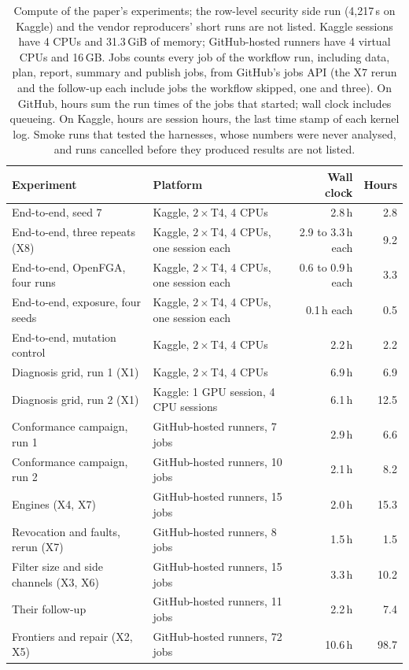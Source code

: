 \begin{table}[!htbp]
\centering
\footnotesize\setlength{\tabcolsep}{4pt}
\begin{tabular}{@{}llrr@{}}
\toprule
Experiment & Platform & Wall clock & Hours \\
\midrule
End-to-end, seed 7 & Kaggle, $2\times$T4, 4 CPUs & 2.8\,h & 2.8 \\
End-to-end, three repeats (X8) & Kaggle, $2\times$T4, 4 CPUs, one session each & 2.9 to 3.3\,h each & 9.2 \\
End-to-end, OpenFGA, four runs & Kaggle, $2\times$T4, 4 CPUs, one session each & 0.6 to 0.9\,h each & 3.3 \\
End-to-end, exposure, four seeds & Kaggle, $2\times$T4, 4 CPUs, one session each & 0.1\,h each & 0.5 \\
End-to-end, mutation control & Kaggle, $2\times$T4, 4 CPUs & 2.2\,h & 2.2 \\
Diagnosis grid, run 1 (X1) & Kaggle, $2\times$T4, 4 CPUs & 6.9\,h & 6.9 \\
Diagnosis grid, run 2 (X1) & Kaggle: 1 GPU session, 4 CPU sessions & 6.1\,h & 12.5 \\
Conformance campaign, run 1 & GitHub-hosted runners, 7 jobs & 2.9\,h & 6.6 \\
Conformance campaign, run 2 & GitHub-hosted runners, 10 jobs & 2.1\,h & 8.2 \\
Engines (X4, X7) & GitHub-hosted runners, 15 jobs & 2.0\,h & 15.3 \\
Revocation and faults, rerun (X7) & GitHub-hosted runners, 8 jobs & 1.5\,h & 1.5 \\
Filter size and side channels (X3, X6) & GitHub-hosted runners, 15 jobs & 3.3\,h & 10.2 \\
Their follow-up & GitHub-hosted runners, 11 jobs & 2.2\,h & 7.4 \\
Frontiers and repair (X2, X5) & GitHub-hosted runners, 72 jobs & 10.6\,h & 98.7 \\
\bottomrule
\end{tabular}
\caption{Compute of the paper's experiments; the row-level security side run (4,217\,s on Kaggle) and the vendor reproducers' short runs are not listed. Kaggle sessions have 4 CPUs and 31.3\,GiB of
memory; GitHub-hosted runners have 4 virtual CPUs and 16\,GB. Jobs counts every job of the workflow
run, including data, plan, report, summary and publish jobs, from GitHub's jobs API (the X7 rerun and
the follow-up each include jobs the workflow skipped, one and three). On GitHub, hours sum the run times of
the jobs that started; wall clock includes queueing. On Kaggle, hours are session hours, the last time stamp of each kernel log. Smoke runs that tested the harnesses, whose numbers were never analysed,
and runs cancelled before they produced results are not listed.}
\label{tab:app-compute}
\end{table}

